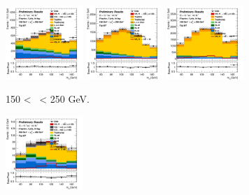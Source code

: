 \begin{figure}[h!]
    \centering
    \begin{subfigure}[b]{\textwidth}
        \centering
        \includegraphics[width=0.32\textwidth]{Images/VH/Own_fit/prefit_VHcc/Region_distmBB_BMax250_BMin150_DtopCRBC_J2_TTypebt_T1_L0_Y6051_Prefit.png}
        \includegraphics[width=0.32\textwidth]{Images/VH/Own_fit/prefit_VHcc/Region_distmBB_BMax250_BMin150_DtopCRBC_J3_TTypebt_T1_L0_Y6051_Prefit.png}
        \includegraphics[width=0.32\textwidth]{Images/VH/Own_fit/prefit_VHcc/Region_distmBB_BMax250_BMin150_DtopCRBC_J4_TTypebt_T1_L0_Y6051_Prefit.png}
        \caption{150 < \ptv\ < 250 GeV.}
        \label{fig:plots_VHcc_OL_150_TopCR_2c}
    \end{subfigure}
    \begin{subfigure}[b]{\textwidth}
        \centering
        \includegraphics[width=0.32\textwidth]{Images/VH/Own_fit/prefit_VHcc/Region_distmBB_BMax400_BMin250_DtopCRBC_J2_TTypebt_T1_L0_Y6051_Prefit.png}

\end{subfigure}
\end{figure}
